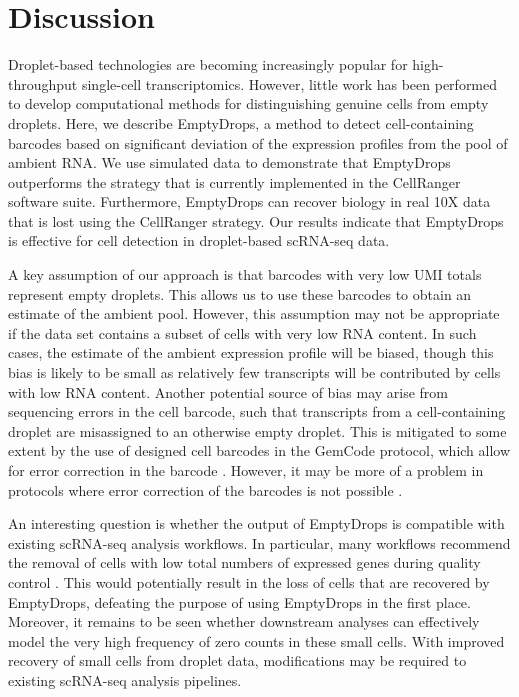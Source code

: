 \documentclass[10pt,letterpaper]{article}
\begin{document}
\section*{Discussion}
Droplet-based technologies are becoming increasingly popular for high-throughput single-cell transcriptomics.
However, little work has been performed to develop computational methods for distinguishing genuine cells from empty droplets.
Here, we describe EmptyDrops, a method to detect cell-containing barcodes based on significant deviation of the expression profiles from the pool of ambient RNA.
We use simulated data to demonstrate that EmptyDrops outperforms the strategy that is currently implemented in the CellRanger software suite.
Furthermore, EmptyDrops can recover biology in real 10X data that is lost using the CellRanger strategy.
Our results indicate that EmptyDrops is effective for cell detection in droplet-based scRNA-seq data.

A key assumption of our approach is that barcodes with very low UMI totals represent empty droplets.
This allows us to use these barcodes to obtain an estimate of the ambient pool.
However, this assumption may not be appropriate if the data set contains a subset of cells with very low RNA content.
In such cases, the estimate of the ambient expression profile will be biased, though this bias is likely to be small as relatively few transcripts will be contributed by cells with low RNA content.
Another potential source of bias may arise from sequencing errors in the cell barcode, such that transcripts from a cell-containing droplet are misassigned to an otherwise empty droplet.
This is mitigated to some extent by the use of designed cell barcodes in the GemCode protocol, which allow for error correction in the barcode \cite{zheng2017massively}.
However, it may be more of a problem in protocols where error correction of the barcodes is not possible \cite{macosko2015highly}.


An interesting question is whether the output of EmptyDrops is compatible with existing scRNA-seq analysis workflows.
In particular, many workflows recommend the removal of cells with low total numbers of expressed genes during quality control \cite{lun2016stepbystep,mccarthy2017scater}.
This would potentially result in the loss of cells that are recovered by EmptyDrops, defeating the purpose of using EmptyDrops in the first place.
Moreover, it remains to be seen whether downstream analyses can effectively model the very high frequency of zero counts in these small cells.
With improved recovery of small cells from droplet data, modifications may be required to existing scRNA-seq analysis pipelines.
\end{document}
